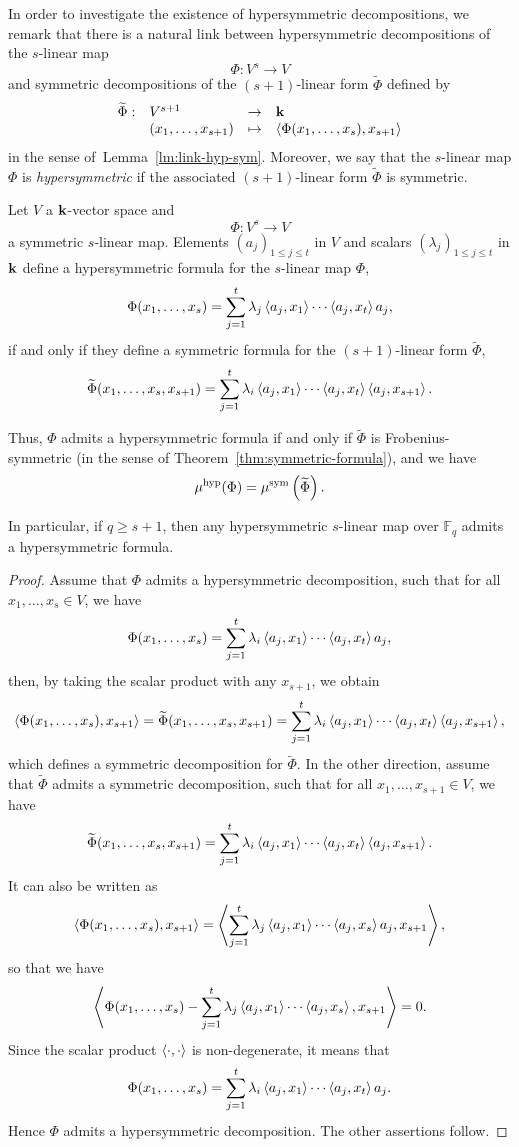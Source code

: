 In order to investigate the existence of hypersymmetric decompositions, we
remark that there is a natural link between hypersymmetric decompositions of 
the $s$-linear map
\[
  \Phi:V^s\to V
\]
and symmetric decompositions of the $(s+1)$-linear form $\widetilde\Phi$ defined by
\[
  \begin{array}{llll}
    \widetilde\Phi:&V^{s+1}&\to&\mathbf{k}\\
    &(x_1, \dots, x_{s+1})&\mapsto&\left\langle\Phi(x_1, \dots, x_s),x_{s+1}\right\rangle
  \end{array}
\]
in the sense of~Lemma~\ref{lm:link-hyp-sym}. Moreover, we say that the
$s$-linear map $\Phi$ is \emph{hypersymmetric} if the associated $(s+1)$-linear
form $\widetilde\Phi$ is symmetric.
\begin{lm}
  \label{lm:link-hyp-sym}
  Let $V$ a $\mathbf{k}$-vector space and 
  \[
    \Phi:V^s\to V
  \]
  a symmetric $s$-linear map. 
Elements $(a_j)_{1\leq j\leq t}$ in $V$ and scalars $(\lambda_j)_{1\leq j\leq t}$ in $\mathbf{k}$ define a hypersymmetric formula for the $s$-linear map $\Phi$,
\[
\Phi(x_1,\dots,x_s)=\sum_{j=1}^{t}\lambda_j\left\langle a_j,x_1\right\rangle\cdots\left\langle a_j,x_t\right\rangle a_j,
\]
if and only if they define a symmetric formula for the $(s+1)$-linear form $\widetilde{\Phi}$,
\[
\widetilde{\Phi}(x_1,\dots,x_s,x_{s+1})=\sum_{j=1}^{t}\lambda_i\left\langle a_j,x_1\right\rangle\cdots\left\langle a_j,x_t\right\rangle\left\langle a_j,x_{s+1}\right\rangle.
\]

Thus, $\Phi$ admits a hypersymmetric formula if and only if $\widetilde{\Phi}$ is Frobenius-symmetric (in the sense of Theorem~\ref{thm:symmetric-formula}),
and we have
\[
\mu^{\textrm{hyp}}(\Phi)=\mu^{\textrm{sym}}\left(\widetilde{\Phi}\right).
\]

In particular, if $q\geq s+1$, then any hypersymmetric $s$-linear map over $\mathbb{F}_q$ admits a hypersymmetric formula.
\end{lm}
\begin{proof}
  Assume that $\Phi$ admits a hypersymmetric decomposition, such that for all
  $x_1, \dots, x_s\in V$, we have
  \[
    \Phi(x_1,\dots,x_s)=\sum_{j=1}^{t}\lambda_i\left\langle a_j,x_1\right\rangle\cdots\left\langle a_j,x_t\right\rangle a_j,
  \]
  then, by taking the scalar product with any $x_{s+1}$, we obtain
\[
  \left\langle\Phi(x_1, \dots,
  x_s),x_{s+1}\right\rangle=\widetilde{\Phi}(x_1,\dots,x_s,x_{s+1})=\sum_{j=1}^{t}\lambda_i\left\langle a_j,x_1\right\rangle\cdots\left\langle a_j,x_t\right\rangle\left\langle a_j,x_{s+1}\right\rangle,
\]
which defines a symmetric decomposition for $\widetilde\Phi$. In the other
direction, assume that $\widetilde\Phi$ admits a symmetric decomposition, such
that for all $x_1, \dots, x_{s+1}\in V$, we have
\[
\widetilde{\Phi}(x_1,\dots,x_s,x_{s+1})=\sum_{j=1}^{t}\lambda_i\left\langle a_j,x_1\right\rangle\cdots\left\langle a_j,x_t\right\rangle\left\langle a_j,x_{s+1}\right\rangle.
\]
It can also be written as
\[
  \left\langle\Phi(x_1, \dots,
  x_s),x_{s+1}\right\rangle=\left\langle\sum_{j=1}^t\lambda_j\left\langle a_j,x_1\right\rangle\cdots\left\langle a_j,x_s\right\rangle a_j,x_{s+1}\right\rangle,
\]
so that we have
\[
  \left\langle\Phi(x_1, \dots,
  x_s)-\sum_{j=1}^t\lambda_j\left\langle a_j,x_1\right\rangle\cdots\left\langle a_j,x_s\right\rangle,x_{s+1}\right\rangle=0.
\]
Since the scalar product $\left\langle\cdot,\cdot\right\rangle$ is non-degenerate, it means that
  \[
    \Phi(x_1,\dots,x_s)=\sum_{j=1}^{t}\lambda_i\left\langle a_j,x_1\right\rangle\cdots\left\langle a_j,x_t\right\rangle a_j.
  \]
  Hence $\Phi$ admits a hypersymmetric decomposition. The other assertions
  follow.
\end{proof}
